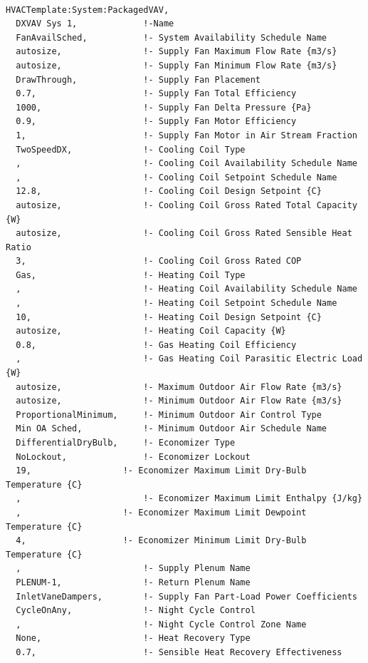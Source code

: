 \begin{lstlisting}

HVACTemplate:System:PackagedVAV,
  DXVAV Sys 1,             !-Name
  FanAvailSched,           !- System Availability Schedule Name
  autosize,                !- Supply Fan Maximum Flow Rate {m3/s}
  autosize,                !- Supply Fan Minimum Flow Rate {m3/s}
  DrawThrough,             !- Supply Fan Placement
  0.7,                     !- Supply Fan Total Efficiency
  1000,                    !- Supply Fan Delta Pressure {Pa}
  0.9,                     !- Supply Fan Motor Efficiency
  1,                       !- Supply Fan Motor in Air Stream Fraction
  TwoSpeedDX,              !- Cooling Coil Type
  ,                        !- Cooling Coil Availability Schedule Name
  ,                        !- Cooling Coil Setpoint Schedule Name
  12.8,                    !- Cooling Coil Design Setpoint {C}
  autosize,                !- Cooling Coil Gross Rated Total Capacity {W}
  autosize,                !- Cooling Coil Gross Rated Sensible Heat Ratio
  3,                       !- Cooling Coil Gross Rated COP
  Gas,                     !- Heating Coil Type
  ,                        !- Heating Coil Availability Schedule Name
  ,                        !- Heating Coil Setpoint Schedule Name
  10,                      !- Heating Coil Design Setpoint {C}
  autosize,                !- Heating Coil Capacity {W}
  0.8,                     !- Gas Heating Coil Efficiency
  ,                        !- Gas Heating Coil Parasitic Electric Load {W}
  autosize,                !- Maximum Outdoor Air Flow Rate {m3/s}
  autosize,                !- Minimum Outdoor Air Flow Rate {m3/s}
  ProportionalMinimum,     !- Minimum Outdoor Air Control Type
  Min OA Sched,            !- Minimum Outdoor Air Schedule Name
  DifferentialDryBulb,     !- Economizer Type
  NoLockout,               !- Economizer Lockout
  19,                  !- Economizer Maximum Limit Dry-Bulb Temperature {C}
  ,                        !- Economizer Maximum Limit Enthalpy {J/kg}
  ,                    !- Economizer Maximum Limit Dewpoint Temperature {C}
  4,                   !- Economizer Minimum Limit Dry-Bulb Temperature {C}
  ,                        !- Supply Plenum Name
  PLENUM-1,                !- Return Plenum Name
  InletVaneDampers,        !- Supply Fan Part-Load Power Coefficients
  CycleOnAny,              !- Night Cycle Control
  ,                        !- Night Cycle Control Zone Name
  None,                    !- Heat Recovery Type
  0.7,                     !- Sensible Heat Recovery Effectiveness

\end{lstlisting}
